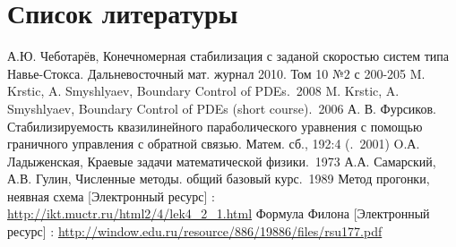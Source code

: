 \section{Список литературы}
\vspace{2em}

\begingroup
\renewcommand{\section}[2]{}%
\begin{thebibliography}{}
\bibitem{}
	А.Ю. Чеботарёв, Конечномерная стабилизация с заданой скоростью систем типа Навье-Стокса. Дальневосточный мат. журнал 2010. Том 10 $№2$ с 200-205
    M. Krstic, A. Smyshlyaev, Boundary Control of PDEs.\ 2008
\bibitem{}
	M. Krstic, A. Smyshlyaev, Boundary Control of PDEs (short course).\ 2006
\bibitem{}
    А. В. Фурсиков. Стабилизируемость квазилинейного параболического уравнения с помощью граничного управления с обратной связью. Матем. сб., 192:4 (.\ 2001)
\bibitem{}
	O.А. Ладыженская, Краевые задачи математической физики.\ 1973
\bibitem{}
	А.А. Самарский, А.В. Гулин, Численные методы. общий базовый курс.\ 1989
\bibitem{}
	Метод прогонки, неявная схема [Электронный ресурс] : \url{http://ikt.muctr.ru/html2/4/lek4_2_1.html}
\bibitem{}
	Формула Филона [Электронный ресурс] : \url{http://window.edu.ru/resource/886/19886/files/rsu177.pdf}

\end{thebibliography}
\endgroup